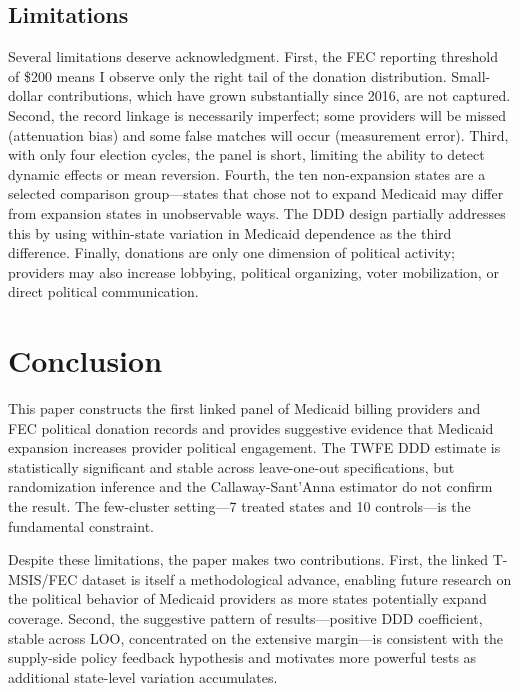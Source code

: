 \documentclass[12pt]{article}
\begin{document}
\subsection{Limitations}

Several limitations deserve acknowledgment. First, the FEC reporting threshold of \$200 means I observe only the right tail of the donation distribution. Small-dollar contributions, which have grown substantially since 2016, are not captured. Second, the record linkage is necessarily imperfect; some providers will be missed (attenuation bias) and some false matches will occur (measurement error). Third, with only four election cycles, the panel is short, limiting the ability to detect dynamic effects or mean reversion. Fourth, the ten non-expansion states are a selected comparison group---states that chose not to expand Medicaid may differ from expansion states in unobservable ways. The DDD design partially addresses this by using within-state variation in Medicaid dependence as the third difference. Finally, donations are only one dimension of political activity; providers may also increase lobbying, political organizing, voter mobilization, or direct political communication.


\section{Conclusion}\label{sec:conclusion}

This paper constructs the first linked panel of Medicaid billing providers and FEC political donation records and provides suggestive evidence that Medicaid expansion increases provider political engagement. The TWFE DDD estimate is statistically significant and stable across leave-one-out specifications, but randomization inference and the Callaway-Sant'Anna estimator do not confirm the result. The few-cluster setting---7 treated states and 10 controls---is the fundamental constraint.

Despite these limitations, the paper makes two contributions. First, the linked T-MSIS/FEC dataset is itself a methodological advance, enabling future research on the political behavior of Medicaid providers as more states potentially expand coverage. Second, the suggestive pattern of results---positive DDD coefficient, stable across LOO, concentrated on the extensive margin---is consistent with the supply-side policy feedback hypothesis and motivates more powerful tests as additional state-level variation accumulates.
\end{document}
